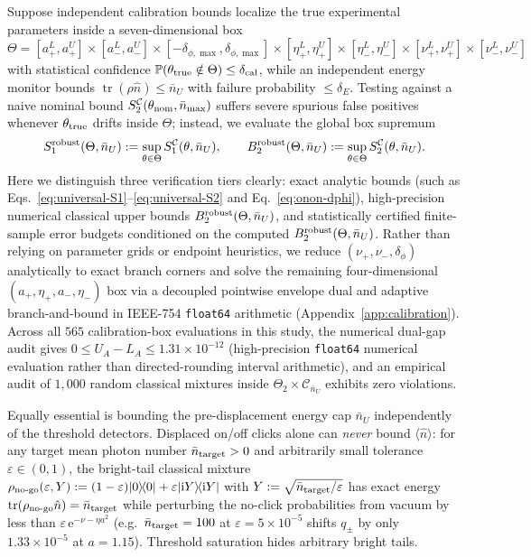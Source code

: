 \documentclass{iopjournal}
\newcommand{\tr}{\operatorname{tr}}
\newcommand{\Cset}{\mathcal{C}}
\newcommand{\nbar}{\bar n_{\max}}
\newcommand{\nU}{\bar n_U}
\newcommand{\ket}[1]{\lvert #1\rangle}
\newcommand{\bra}[1]{\langle #1\rvert}
\newcommand{\ii}{\mathrm{i}}
\newcommand{\ee}{\mathrm{e}}
\begin{document}
Suppose independent calibration bounds localize the true experimental parameters inside a seven-dimensional box $\Theta = [a_+^L, a_+^U] \times [a_-^L, a_-^U] \times [-\delta_{\phi,\max}, \delta_{\phi,\max}] \times [\eta_+^L, \eta_+^U] \times [\eta_-^L, \eta_-^U] \times [\nu_+^L, \nu_+^U] \times [\nu_-^L, \nu_-^U]$ with statistical confidence $\mathbb{P}(\theta_{\rm true} \notin \Theta) \le \delta_{\rm cal}$, while an independent energy monitor bounds $\tr(\rho\hat n) \le \nU$ with failure probability $\le \delta_E$. Testing against a naive nominal bound $S_2^{\Cset}(\theta_{\rm nom}, \nbar)$ suffers severe spurious false positives whenever $\theta_{\rm true}$ drifts inside $\Theta$; instead, we evaluate the global box supremum
\begin{equation}\label{eq:B2-robust-def}
S_1^{\rm robust}(\Theta,\nU) := \sup_{\theta \in \Theta} S_1^{\Cset}(\theta,\nU), \qquad
B_2^{\rm robust}(\Theta,\nU) := \sup_{\theta \in \Theta} S_2^{\Cset}(\theta,\nU).
\end{equation}
Here we distinguish three verification tiers clearly: exact analytic bounds (such as Eqs.~\eqref{eq:universal-S1}--\eqref{eq:universal-S2} and Eq.~\eqref{eq:onon-dphi}), high-precision numerical classical upper bounds $B_2^{\rm robust}(\Theta,\nU)$, and statistically certified finite-sample error budgets conditioned on the computed $B_2^{\rm robust}(\Theta,\nU)$. Rather than relying on parameter grids or endpoint heuristics, we reduce $(\nu_+,\nu_-,\delta_\phi)$ analytically to exact branch corners and solve the remaining four-dimensional $(a_+,\eta_+,a_-,\eta_-)$ box via a decoupled pointwise envelope dual and adaptive branch-and-bound in IEEE-754 \texttt{float64} arithmetic (Appendix~\ref{app:calibration}). Across all $565$ calibration-box evaluations in this study, the numerical dual-gap audit gives $0 \le U_A - L_A \le 1.31 \times 10^{-12}$ (high-precision \texttt{float64} numerical evaluation rather than directed-rounding interval arithmetic), and an empirical audit of $1{,}000$ random classical mixtures inside $\Theta_2 \times \Cset_{\nU}$ exhibits zero violations.

Equally essential is bounding the pre-displacement energy cap $\nU$ independently of the threshold detectors. Displaced on/off clicks alone can \emph{never} bound $\langle\hat n\rangle$: for any target mean photon number $\bar n_{\rm target} > 0$ and arbitrarily small tolerance $\varepsilon \in (0,1)$, the bright-tail classical mixture $\rho_{\rm no\text{-}go}(\varepsilon, Y) := (1-\varepsilon)\ket{0}\!\bra{0} + \varepsilon\ket{\ii Y}\!\bra{\ii Y}$ with $Y := \sqrt{\bar n_{\rm target}/\varepsilon}$ has exact energy $\tr(\rho_{\rm no\text{-}go}\hat n) = \bar n_{\rm target}$ while perturbing the no-click probabilities from vacuum by less than $\varepsilon\,\ee^{-\nu-\eta a^2}$ (e.g.\ $\bar n_{\rm target} = 100$ at $\varepsilon = 5 \times 10^{-5}$ shifts $q_\pm$ by only $1.33 \times 10^{-5}$ at $a = 1.15$). Threshold saturation hides arbitrary bright tails.
\end{document}

